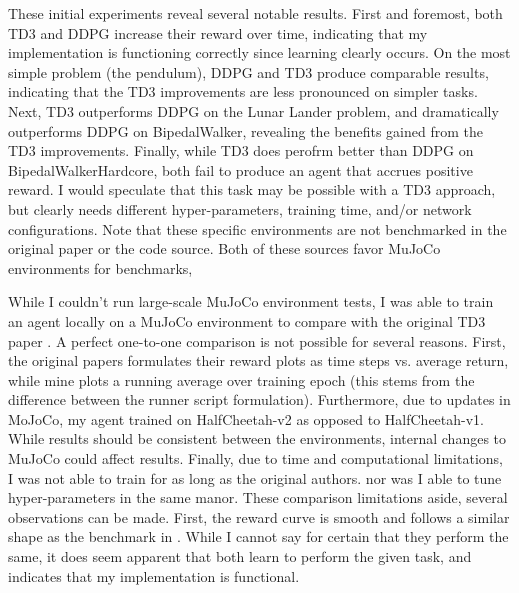 \documentclass{article}
\begin{document}
These initial experiments reveal several notable results. First and foremost, both TD3 and DDPG increase their reward over time, indicating that my implementation is functioning correctly since learning clearly occurs. On the most simple problem (the pendulum), DDPG and TD3 produce comparable results, indicating that the TD3 improvements are less pronounced on simpler tasks. Next, TD3 outperforms DDPG on the Lunar Lander problem, and dramatically outperforms DDPG on BipedalWalker, revealing the benefits gained from the TD3 improvements. Finally, while TD3 does perofrm better than DDPG on BipedalWalkerHardcore, both fail to produce an agent that accrues positive reward. I would speculate that this task may be possible with a TD3 approach, but clearly needs different hyper-parameters, training time, and/or network configurations. Note that these specific environments are not benchmarked in the original paper or the code source. Both of these sources favor MuJoCo environments for benchmarks, 

While I couldn't run large-scale MuJoCo environment tests, I was able to train an agent locally on a MuJoCo environment to compare with the original TD3 paper \cite{td3}. A perfect one-to-one comparison is not possible for several reasons. First, the original papers formulates their reward plots as time steps vs. average return, while mine plots a running average over training epoch (this stems from the difference between the runner script formulation). Furthermore, due to updates in MoJoCo, my agent trained on HalfCheetah-v2 as opposed to HalfCheetah-v1. While results should be consistent between the environments, internal changes to MuJoCo could affect results. Finally, due to time and computational limitations, I was not able to train for as long as the original authors. nor was I able to tune hyper-parameters in the same manor. These comparison limitations aside, several observations can be made. First, the reward curve is smooth and follows a similar shape as the benchmark in \cite{td3}. While I cannot say for certain that they perform the same, it does seem apparent that both learn to perform the given task, and indicates that my implementation is functional.


\FloatBarrier


\end{document}
